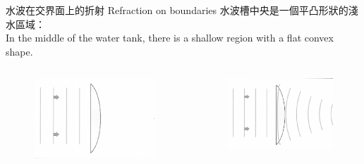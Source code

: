 \documentclass[beamer=true]{standalone}
\begin{document}
\begin{frame}{水波在交界面上的折射 Refraction on boundaries}
    水波槽中央是一個平凸形狀的淺水區域：\\In the middle of the water tank, there is a shallow region with a flat convex shape.
    \begin{columns}
        \begin{figure}
            \centering
            \includegraphics[width=1\linewidth]{images/Screenshot 2023-09-27 at 8.31.00 PM.png}


        \end{figure}
        \begin{figure}
            \centering
            \includegraphics[width=1\linewidth]{images/Screenshot 2023-09-27 at 8.31.30 PM.png}


        \end{figure}
    \end{columns}
\end{frame}
\end{document}
